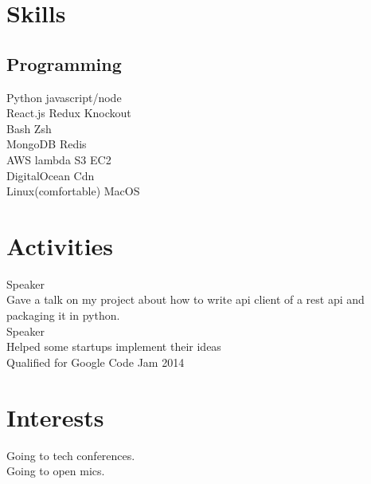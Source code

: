 \documentclass[]{deedy-resume-openfont}
\begin{document}
\begin{minipage}[t]{0.33\textwidth}




\section{Skills}
\subsection{Programming}
\textbullet{} Python \textbullet{} javascript/node \\
\textbullet{} React.js \textbullet{} Redux \textbullet{} Knockout \\
\textbullet{} Bash \textbullet{} Zsh \\
\textbullet{} MongoDB \textbullet{} Redis \\
\textbullet{} AWS lambda \textbullet{} S3 \textbullet{} EC2 \\
\textbullet{} DigitalOcean \textbullet{} Cdn \\
\textbullet{} Linux(comfortable) \textbullet{} MacOS \\
\sectionsep

%
%

\section{Activities}
\textbullet{} Speaker \\
\textbullet{} Gave a talk on my project about how to write api client of a rest api and packaging it in python. \\
\textbullet{} Speaker \\
\textbullet{} Helped some startups implement their ideas \\
\textbullet{} Qualified for Google Code Jam 2014  \\
\sectionsep
%
%

\section{Interests}
\textbullet{} Going to tech conferences. \\
\textbullet{} Going to open mics. \\

%
%

\end{minipage}
\end{document}
